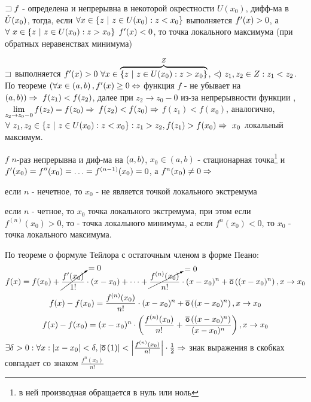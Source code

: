 \begin{proofs}
 $\sqsupset f$ - определена и непрерывна в некоторой окрестности $U(x_0)$, дифф-ма в $\mathring{U}(x_0)$, тогда, если $\forall x \in \left\{ z \ | \ z \in U(x_0) : z < x_0\right\}$ выполняется $f^{\prime}(x) > 0$, а $\forall \ x \in \left\{ z \ | \ z \in U(x_0): z > x_0\right\}$
$f^{\prime}(x) < 0$, то  точка локального максимума (при обратных неравенствах минимума)
\begin{dokvo}
	$\sqsupset$ выполняется $f^{\prime}(x)>0 \ \forall x \in \overbrace{\left\{ z \ | \ z \in U(x_0) : z > x_0\right\}}^{Z}$, $<\mkern-4mu) \ z_1, z_2 \in Z: z_1 < z_2$. По теореме $(\forall x \in \left( a,b\right), f^{\prime}(x) \geq 0 \Leftrightarrow$ функция $f$ - не убывает на $\left( a,b\right)) \Rightarrow \ f(z_1) < f(z_2)$, далее  при $z_2 \to z_0 - 0$ из-за непрерывности функции \fx, $\lim\limits_{z_2 \to z_0 - 0}f(z_2) = f(z_0) \Rightarrow$ $f(z_2) < f(z_0) \Rightarrow$ $f(z_1)< f(x_0)$, аналогично, $\forall \ z_1, z_2 \in \left\{ z \ | \ z \in U(x_0) : z < x_0\right\}: z_1 > z_2, f(z_1) > f(x_0) \Rightarrow \ x_0$ локальный максимум.
\end{dokvo}

 $f$ $n$-раз непрерывна и диф-ма на $\left( a,b\right)$, $x_0 \in (a,b)$ - стационарная точка\footnote{в ней производная обращается в нуль или ноль} и $f^{\prime}(x_0)= f^{\prime\prime}(x_0) = \ldots = f^{(n-1)}(x_0)= 0$, а $f^{n}(x_0) \neq 0 \Rightarrow$

если $n$ - нечетное, то $x_0$ - не является точкой локального экстремума

если $n$ - четное, то $x_0$ точка локального экстремума, при этом если $f^{(n)}(x_0) > 0$, то  - точка локального минимума, а если $f^{n}(x_0) < 0$, то $x_0$ - точка локального максимума.
\begin{dokvo}
	По теореме о формуле Тейлора с остаточным членом в форме Пеано:
	\begin{gather*}
		f(x) = f(x_0) + \cancelto{= 0}{\frac{f^{\prime}(x_0)}{1!}}\cdot (x-x_0) + \cdots + \cancelto{= 0}{\frac{f^{(n)}(x_0)}{n!}}\cdot (x-x_0)^{n} + \overline{\mathsf{o}}\left( (x-x_0)^{n}\right), x \to x_0 \\
		f(x) - f(x_0) = \frac{f^{(n)}(x_0)}{n!}\cdot (x - x_0)^{n} + \overline{\mathsf{o}}\left( (x - x_0)^{n}\right), x \to x_0 \\
		f(x) - f(x_0) = (x - x_0)^{n} \cdot \left( \frac{f^{(n)}(x_0)}{n!} + \frac{\overline{\mathsf{o}}\left( (x-x_0)^{n}\right)}{(x-x_0)^{n}}\right), x \to x_0
	\end{gather*}
	$\exists \delta > 0: \forall x: \left| x- x_0\right| < \delta, \left| \overline{\mathsf{o}}\left( 1\right)\right| < \left| \frac{f^{(n)}(x_0)}{n!}\right|\cdot \frac{1}{2} \Rightarrow$ знак выражения в скобках совпадает со знаком $\frac{f^{n}(x_0)}{n!}$


\end{dokvo}
\end{proofs}
